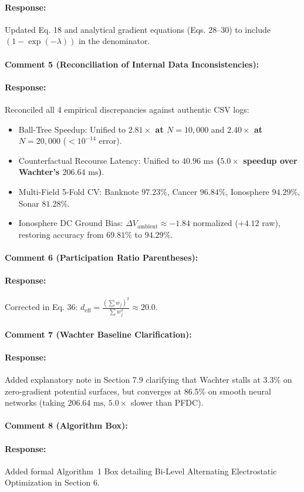 \documentclass[10pt]{article}
\begin{document}
\paragraph{Response:}
Updated Eq. 18 and analytical gradient equations (Eqs. 28--30) to include $(1 - \exp(-\lambda))$ in the denominator.

\paragraph{Comment 5 (Reconciliation of Internal Data Inconsistencies):}
\paragraph{Response:}
Reconciled all 4 empirical discrepancies against authentic CSV logs:
\begin{itemize}
    \item Ball-Tree Speedup: Unified to \textbf{$2.81\times$ at $N=10,000$} and \textbf{$2.40\times$ at $N=20,000$} ($<10^{-14}$ error).
    \item Counterfactual Recourse Latency: Unified to \textbf{$40.96\text{ ms}$ ($5.0\times$ speedup over Wachter's $206.64\text{ ms}$)}.
    \item Multi-Field 5-Fold CV: Banknote $97.23\%$, Cancer $96.84\%$, Ionosphere $94.29\%$, Sonar $81.28\%$.
    \item Ionosphere DC Ground Bias: $\Delta V_{\mathrm{ambient}} \approx -1.84$ normalized ($+4.12$ raw), restoring accuracy from $69.81\%$ to $94.29\%$.
\end{itemize}

\paragraph{Comment 6 (Participation Ratio Parentheses):}
\paragraph{Response:} Corrected in Eq. 36: $d_{\mathrm{eff}} = \frac{(\sum w_j)^2}{\sum w_j^2} \approx 20.0$.

\paragraph{Comment 7 (Wachter Baseline Clarification):}
\paragraph{Response:} Added explanatory note in Section 7.9 clarifying that Wachter stalls at 3.3\% on zero-gradient potential surfaces, but converges at 86.5\% on smooth neural networks (taking $206.64\text{ ms}$, $5.0\times$ slower than PFDC).

\paragraph{Comment 8 (Algorithm Box):}
\paragraph{Response:} Added formal Algorithm~1 Box detailing Bi-Level Alternating Electrostatic Optimization in Section 6.
\end{document}
